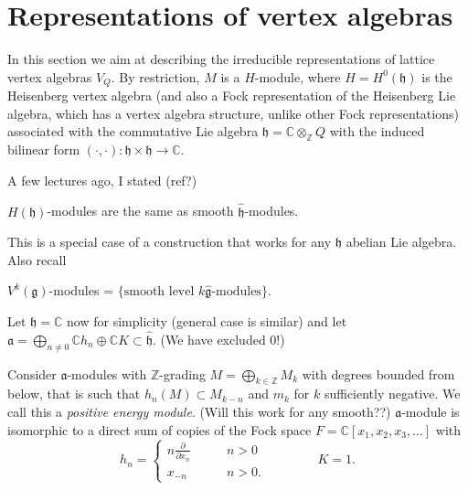 \section{Representations of vertex algebras}
\label{section-representations-vertex-algebras}

\noindent
In this section we aim at describing the
irreducible representations of lattice vertex algebras $V_Q$.
By restriction, $M$ is a $H$-module,
where $H=H^0(\mathfrak{h})$ is the Heisenberg vertex algebra
(and also a Fock representation of the Heisenberg Lie algebra,
which has a vertex algebra
structure, unlike other Fock representations)
associated with the commutative Lie algebra
$\mathfrak{h}=\mathbb{C}\otimes_\mathbb{Z}Q$
with the induced bilinear form
$(\cdot,\cdot):\mathfrak{h}\times\mathfrak{h}\to\mathbb{C}$.

A few lectures ago, I stated
(ref?)

\begin{proposition}
\label{proposition-past}
$H(\mathfrak{h})$-modules are the same as smooth $\hat{\mathfrak{h}}$-modules.
\end{proposition}

\noindent
This is a special case of a construction that works
for any $\mathfrak{h}$ abelian Lie algebra. Also recall

\begin{proposition}
\label{proposition-past2}
$V^k(\mathfrak{g})$-modules = $\{\text{smooth level $k$
$\hat{\mathfrak{g}}$-modules}\}$.
\end{proposition}

\noindent
Let $\mathfrak{h}=\mathbb{C}$ now for simplicity
(general case is similar) and let
$\mathfrak{a}=\bigoplus_{n \neq 0}\mathbb{C}h_n \oplus \mathbb{C} K \subset
\hat{\mathfrak{h}}$. (We have excluded 0!)

\begin{proposition}
\label{proposition-representations-of-heisenberg}
Consider $\mathfrak{a}$-modules with $\mathbb{Z}$-grading
$M=\bigoplus_{k \in \mathbb{Z}}M_k$ with degrees bounded from below,
that is such that $h_n(M) \subset M_{k-n}$
and $m_k$ for $k$ sufficiently negative.
We call this a {\it positive energy module}.
(Will this work for any smooth??) $\mathfrak{a}$-module is isomorphic to a direct
sum of copies of the Fock space $F=\mathbb{C}[x_1,x_2,x_3,\ldots]$
with
$$
h_n=
\begin{cases}
n\frac{\partial }{\partial x_n}\qquad &n>0 \\
x_{-n}\qquad &n>0.
\end{cases}
\qquad \qquad K=1.
$$
\end{proposition}

